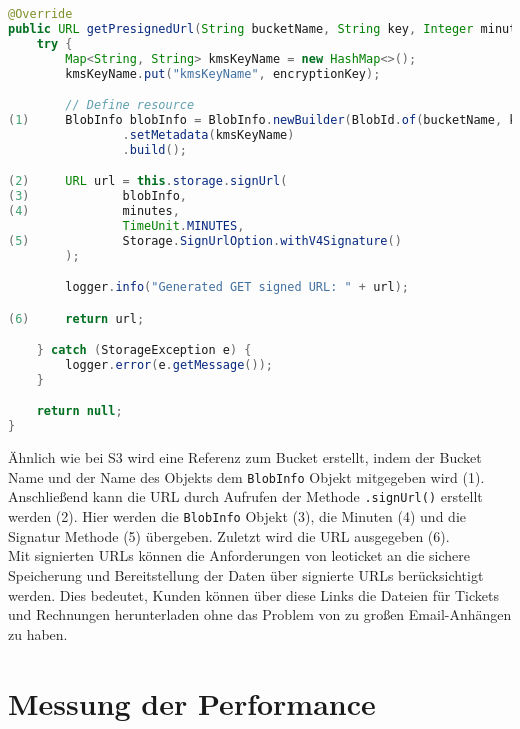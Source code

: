 \begin{lstlisting}[language=Java, caption=Prototyp Code Snippet - Generierung einer signierten URL durch GC]
@Override
public URL getPresignedUrl(String bucketName, String key, Integer minutes, String encryptionKey) {
    try {
        Map<String, String> kmsKeyName = new HashMap<>();
        kmsKeyName.put("kmsKeyName", encryptionKey);

        // Define resource
(1)     BlobInfo blobInfo = BlobInfo.newBuilder(BlobId.of(bucketName, key))
                .setMetadata(kmsKeyName)
                .build();

(2)     URL url = this.storage.signUrl(
(3)             blobInfo,
(4)             minutes,
                TimeUnit.MINUTES,
(5)             Storage.SignUrlOption.withV4Signature()
        );

        logger.info("Generated GET signed URL: " + url);

(6)     return url;

    } catch (StorageException e) {
        logger.error(e.getMessage());
    }

    return null;
}
\end{lstlisting}

Ähnlich wie bei S3 wird eine Referenz zum Bucket erstellt, indem der Bucket Name und der Name des Objekts dem \verb|BlobInfo| Objekt mitgegeben wird (1). Anschließend kann die URL durch Aufrufen der Methode \verb|.signUrl()| erstellt werden (2). Hier werden die \verb|BlobInfo| Objekt (3), die Minuten (4) und die Signatur Methode (5) übergeben. Zuletzt wird die URL ausgegeben (6).\\

Mit signierten URLs können die Anforderungen von leoticket an die sichere Speicherung und Bereitstellung der Daten über signierte URLs berücksichtigt werden. Dies bedeutet, Kunden können über diese Links die Dateien für Tickets und Rechnungen herunterladen ohne das Problem von zu großen Email-Anhängen zu haben.\\

\newpage

\section{Messung der Performance}

